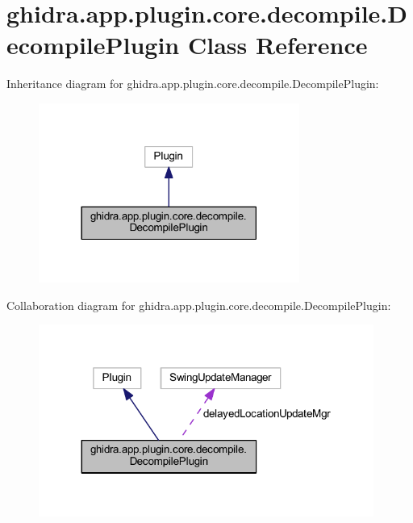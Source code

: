 \hypertarget{classghidra_1_1app_1_1plugin_1_1core_1_1decompile_1_1_decompile_plugin}{}\section{ghidra.\+app.\+plugin.\+core.\+decompile.\+Decompile\+Plugin Class Reference}
\label{classghidra_1_1app_1_1plugin_1_1core_1_1decompile_1_1_decompile_plugin}


Inheritance diagram for ghidra.\+app.\+plugin.\+core.\+decompile.\+Decompile\+Plugin\+:
\nopagebreak
\begin{figure}[H]
\begin{center}
\leavevmode
\includegraphics[width=242pt]{classghidra_1_1app_1_1plugin_1_1core_1_1decompile_1_1_decompile_plugin__inherit__graph}
\end{center}
\end{figure}


Collaboration diagram for ghidra.\+app.\+plugin.\+core.\+decompile.\+Decompile\+Plugin\+:
\nopagebreak
\begin{figure}[H]
\begin{center}
\leavevmode
\includegraphics[width=311pt]{classghidra_1_1app_1_1plugin_1_1core_1_1decompile_1_1_decompile_plugin__coll__graph}
\end{center}
\end{figure}
